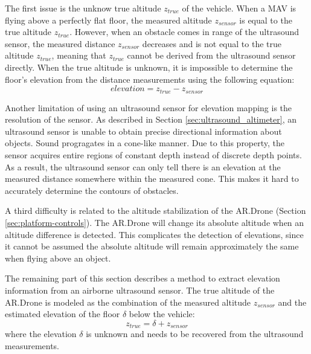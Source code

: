 The first issue is the unknow true altitude $z_{true}$ of the vehicle.
When a MAV is flying above a perfectly flat floor, the measured altitude $z_{sensor}$ is equal to the true altitude $z_{true}$.
However, when an obstacle comes in range of the ultrasound sensor, the measured distance $z_{sensor}$ decreases and is not equal to the true altitude $z_{true}$, meaning that $z_{true}$ cannot be derived from the ultrasound sensor directly.
When the true altitude is unknown, it is impossible to determine the floor's elevation from the distance measurements using the following equation:
\begin{equation}
elevation = z_{true} - z_{sensor}
\end{equation}

Another limitation of using an ultrasound sensor for elevation mapping is the resolution of the sensor.
As described in Section \ref{sec:ultrasound_altimeter}, an ultrasound sensor is unable to obtain precise directional information about objects.
Sound progragates in a cone-like manner.
Due to this property, the sensor acquires entire regions of constant depth instead of discrete depth points.
As a result, the ultrasound sensor can only tell there is an elevation at the measured distance somewhere within the measured cone.
This makes it hard to accurately determine the contours of obstacles.

A third difficulty is related to the altitude stabilization of the AR.Drone (Section \ref{sec:platform-controls}).
The AR.Drone will change its absolute altitude when an altitude difference is detected.
This complicates the detection of elevations, since it cannot be assumed the absolute altitude will remain approximately the same when flying above an object.

The remaining part of this section describes a method to extract elevation information from an airborne ultrasound sensor.
The true altitude of the AR.Drone is modeled as the combination of the measured altitude $z_{sensor}$ and the estimated elevation of the floor $\delta$ below the vehicle:
\begin{equation}
z_{true} = \delta + z_{sensor}
\end{equation}
where the elevation $\delta$ is unknown and needs to be recovered from the ultrasound measurements.

